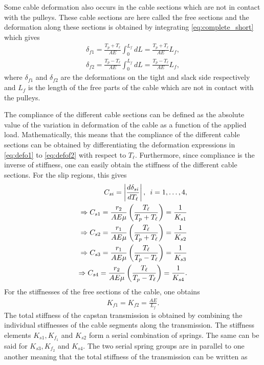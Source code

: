\documentclass[10pt,cleanfoot]{asme2ej}
\newcommand{\hquad}{\hspace{0.5em}}
\begin{document}
Some cable deformation also occurs in the cable sections which are not in contact with the pulleys. These cable sections are here called the free sections and the deformation along these sections is obtained by integrating \eqref{eq:complete_short} which gives
\begin{align}
\delta_{f1} = \frac{T_p+T_\ell}{AE}\int_0^{L_f}dL=\frac{T_p+T_\ell}{AE}L_f,\label{eq:defof1}\\
\delta_{f2}=\frac{T_p-T_\ell}{AE}\int_0^{L_f}dL=\frac{T_p-T_\ell}{AE}L_f,\label{eq:defof2}
\end{align}
where $\delta_{f1}$ and $\delta_{f2}$ are the deformations on the tight and slack side respectively and $L_f$ is the length of the free parts of the cable which are not in contact with the pulleys.
\par
 The compliance of the different cable sections can be defined as the absolute value of the variation in deformation of the cable as a function of the applied load. Mathematically, this means that the compliance of the different cable sections can be obtained by differentiating the deformation expressions in \eqref{eq:defo1} to \eqref{eq:defof2} with respect to $T_\ell$. Furthermore, since compliance is the inverse of stiffness, one can easily obtain the stiffness of the different cable sections. For the slip regions, this gives
 \begin{align}
     C_{si}=\left|\frac{d\delta_{si}}{dT_\ell}\right|,\hquad i = 1,\ldots ,4,\label{eq:simple_stiff_1}\\
     \Rightarrow C_{s1} = \frac{r_2}{AE\mu}\left(\frac{T_\ell}{T_p+T_\ell}\right) = \frac{1}{K_{s1}}\\
     \Rightarrow C_{s2} = \frac{r_1}{AE\mu}\left(\frac{T_\ell}{T_p+T_\ell}\right)= \frac{1}{K_{s2}}\\
     \Rightarrow C_{s3} =
     \frac{r_1}{AE\mu}\left(\frac{T_\ell}{T_p-T_\ell}\right)= \frac{1}{K_{s3}}\\
     \Rightarrow C_{s4} =
     \frac{r_2}{AE\mu}\left(\frac{T_\ell}{T_p-T_\ell}\right)= \frac{1}{K_{s4}}.\label{eq:simple_stiff_4}
 \end{align}
 For the stiffnesses of the free sections of the cable, one obtains
 \begin{align}
     K_{f1}=K_{f2}=\frac{AE}{L_f}.
 \end{align}
 The total stiffness of the capstan transmission is obtained by combining the individual stiffnesses of the cable segments along the transmission. The stiffness elements $K_{s1},K_{f_1}$ and $K_{s2}$ form a serial combination of springs. The same can be said for $K_{s3},K_{f_2}$ and $K_{s4}$. The two serial spring groups are in parallel to one another meaning that the total stiffness of the transmission can be written as 
\end{document}
